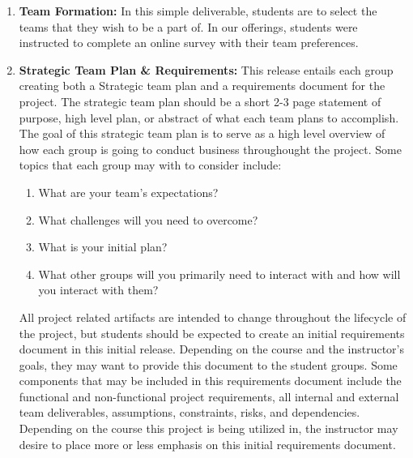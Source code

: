 \documentclass{sig-alternate-05-2015}
\begin{document}

\begin{enumerate}
	\item \textbf{Team Formation:} In this simple deliverable, students are to select the teams that they wish to be a part of. In our offerings, students were instructed to complete an online survey with their team preferences.
	\item \textbf{Strategic Team Plan \& Requirements:} This release entails each group creating both a Strategic team plan and a requirements document for the project. The strategic team plan should be a short 2-3 page statement of purpose, high level plan, or abstract of what each team plans to accomplish. 	The goal of this strategic team plan is to serve as a high level overview of how each group is going to conduct business throughought the project. Some topics that each group may with to consider include:	
	\begin{enumerate}
		\setlength{\itemsep}{.8pt}     		
		\setlength{\parskip}{0pt}     		
		\setlength{\parsep}{0pt}  
		\item What are your team's expectations?
		\item What challenges will you need to overcome?
		\item What is your initial plan?
		\item What other groups will you primarily need to interact with and how will you interact with them?
	\end{enumerate}
	
All project related artifacts are intended to change throughout the lifecycle of the project, but students should be expected to create an initial requirements document in this initial release. Depending on the course and the instructor's goals, they may want to provide this document to the student groups. Some components that may be included in this requirements document include the functional and non-functional project requirements, all internal and external team deliverables, assumptions, constraints, risks, and dependencies. Depending on the course this project is being utilized in, the instructor may desire to place more or less emphasis on this initial requirements document.


\end{enumerate}
\end{document}
